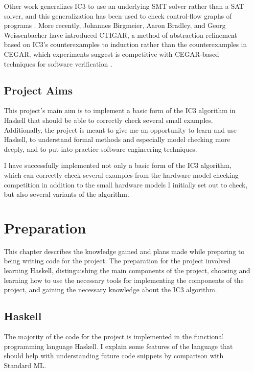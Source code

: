 \documentclass[12pt,a4paper,twoside,openright]{report}
\begin{document}
Other work generalizes IC3 to use an underlying SMT solver rather than a
SAT solver, and this generalization has been used to check control-flow
graphs of programs \cite{cimatti12}.
More recently, Johannes Birgmeier, Aaron Bradley, and Georg Weissenbacher
have introduced CTIGAR, a method of abstraction-refinement based on IC3's
counterexamples to induction rather than the counterexamples in CEGAR,
which experiments suggest is competitive with CEGAR-based techniques for
software verification \cite{birgmeier14}.

\section{Project Aims}

This project's main aim is to implement a basic form of the IC3 algorithm in
Haskell that should be able to correctly check several
small examples. Additionally, the project is meant to give me an opportunity
to learn and use Haskell, to understand formal methods and especially model
checking more deeply, and to put into practice software engineering techniques.

I have successfully implemented not only a basic form of the IC3 algorithm,
which can correctly check several examples from the hardware model checking
competition in addition to the small hardware models I initially set out
to check, but also several variants of the algorithm.

\chapter{Preparation}

This chapter describes the knowledge gained and plans made while preparing
to being writing code for the project.
The preparation for the project involved learning Haskell, distinguishing
the main components of the project, choosing and learning how to use
the necessary tools for implementing the components of the project,
and gaining the necessary knowledge about the IC3 algorithm.

\section{Haskell}

The majority of the code for the project is implemented in the functional
programming language Haskell. I explain some features of the
language that should help with understanding future code snippets
by comparison with Standard ML.
\end{document}

